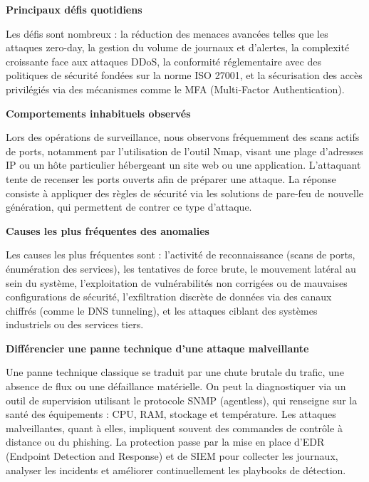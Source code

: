 \documentclass[12pt,a4paper]{report}
\begin{document}
\bigskip
\textbf{Principaux défis quotidiens}

Les d\'{e}fis sont nombreux : la r\'{e}duction des menaces avanc\'{e}es telles que les attaques zero-day, la gestion du volume de journaux et d'alertes, la complexit\'{e} croissante face aux attaques DDoS, la conformit\'{e} r\'{e}glementaire avec des politiques de s\'{e}curit\'{e} fond\'{e}es sur la norme ISO 27001, et la s\'{e}curisation des acc\`{e}s privil\'{e}gi\'{e}s via des m\'{e}canismes comme le MFA (Multi-Factor Authentication).

\bigskip
\textbf{Comportements inhabituels observés}

Lors des op\'{e}rations de surveillance, nous observons fr\'{e}quemment des scans actifs de ports, notamment par l'utilisation de l'outil Nmap, visant une plage d'adresses IP ou un h\^{o}te particulier h\'{e}bergeant un site web ou une application. L'attaquant tente de recenser les ports ouverts afin de pr\'{e}parer une attaque. La r\'{e}ponse consiste \`{a} appliquer des r\`{e}gles de s\'{e}curit\'{e} via les solutions de pare-feu de nouvelle g\'{e}n\'{e}ration, qui permettent de contrer ce type d'attaque.

\bigskip
\textbf{Causes les plus fréquentes des anomalies}

Les causes les plus fr\'{e}quentes sont : l'activit\'{e} de reconnaissance (scans de ports, \'{e}num\'{e}ration des services), les tentatives de force brute, le mouvement lat\'{e}ral au sein du syst\`{e}me, l'exploitation de vuln\'{e}rabilit\'{e}s non corrig\'{e}es ou de mauvaises configurations de s\'{e}curit\'{e}, l'exfiltration discr\`{e}te de donn\'{e}es via des canaux chiffr\'{e}s (comme le DNS tunneling), et les attaques ciblant des syst\`{e}mes industriels ou des services tiers.

\bigskip
\textbf{Différencier une panne technique d'une attaque malveillante}

Une panne technique classique se traduit par une chute brutale du trafic, une absence de flux ou une d\'{e}faillance mat\'{e}rielle. On peut la diagnostiquer via un outil de supervision utilisant le protocole SNMP (agentless), qui renseigne sur la sant\'{e} des \'{e}quipements : CPU, RAM, stockage et temp\'{e}rature. Les attaques malveillantes, quant \`{a} elles, impliquent souvent des commandes de contr\^{o}le \`{a} distance ou du phishing. La protection passe par la mise en place d'EDR (Endpoint Detection and Response) et de SIEM pour collecter les journaux, analyser les incidents et am\'{e}liorer continuellement les playbooks de d\'{e}tection.
\end{document}
